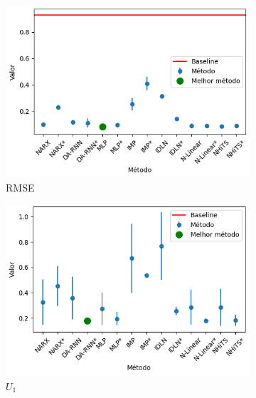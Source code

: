 \begin{figure}[htbp]
	\begin{subfigure}[b]{0.3\textwidth}
		\centering
		\includegraphics[width=\textwidth]{figuras/rmse_brasil_oil_results.png}
		\caption{\ac{RMSE}}
		\label{fig:rmse_brasil_oil_results}
	\end{subfigure}
	\hfill
	\begin{subfigure}[b]{0.3\textwidth}
		\centering
		\includegraphics[width=\textwidth]{figuras/u1_brasil_oil_results.png}
		\caption{\(U_1\)}
		\label{fig:u1_brasil_oil_results}
	\end{subfigure}
	\hfill
	\begin{subfigure}[b]{0.3\textwidth}
		\centering

\end{subfigure}
\end{figure}
